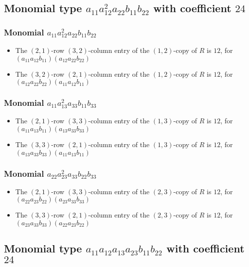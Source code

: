 \documentclass{article}
\begin{document}
\subsection{Monomial type $ a_{11} a_{12}^{2} a_{22} b_{11} b_{22} $ with coefficient $ 24 $}

\subsubsection{Monomial $ a_{11} a_{12}^{2} a_{22} b_{11} b_{22} $}

\begin{itemize}
\item The $(2, 1)$-row $(3, 2)$-column entry of the $ \left(1, 2\right) $-copy of $R$ is $ 12 $, for $( a_{11} a_{12} b_{11} )( a_{12} a_{22} b_{22} )$ 
\item The $(3, 2)$-row $(2, 1)$-column entry of the $ \left(1, 2\right) $-copy of $R$ is $ 12 $, for $( a_{12} a_{22} b_{22} )( a_{11} a_{12} b_{11} )$ 
\end{itemize}
\subsubsection{Monomial $ a_{11} a_{13}^{2} a_{33} b_{11} b_{33} $}

\begin{itemize}
\item The $(2, 1)$-row $(3, 3)$-column entry of the $ \left(1, 3\right) $-copy of $R$ is $ 12 $, for $( a_{11} a_{13} b_{11} )( a_{13} a_{33} b_{33} )$ 
\item The $(3, 3)$-row $(2, 1)$-column entry of the $ \left(1, 3\right) $-copy of $R$ is $ 12 $, for $( a_{13} a_{33} b_{33} )( a_{11} a_{13} b_{11} )$ 
\end{itemize}
\subsubsection{Monomial $ a_{22} a_{23}^{2} a_{33} b_{22} b_{33} $}

\begin{itemize}
\item The $(2, 1)$-row $(3, 3)$-column entry of the $ \left(2, 3\right) $-copy of $R$ is $ 12 $, for $( a_{22} a_{23} b_{22} )( a_{23} a_{33} b_{33} )$ 
\item The $(3, 3)$-row $(2, 1)$-column entry of the $ \left(2, 3\right) $-copy of $R$ is $ 12 $, for $( a_{23} a_{33} b_{33} )( a_{22} a_{23} b_{22} )$ 
\end{itemize}
\subsection{Monomial type $ a_{11} a_{12} a_{13} a_{23} b_{11} b_{22} $ with coefficient $ 24 $}
\end{document}
